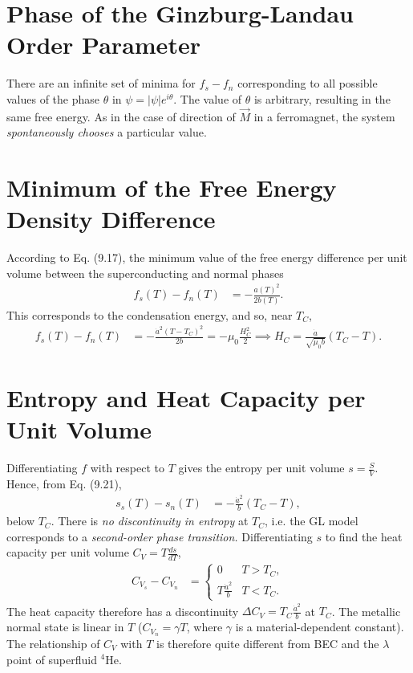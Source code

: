 \documentclass[qo.tex]{subfiles}
\begin{document}
\section{Phase of the Ginzburg-Landau Order Parameter}
There are an infinite set of minima for $f_s-f_n$ corresponding to all possible values of the phase $\theta$ in $\psi=|\psi|e^{i\theta}$.
The value of $\theta$ is arbitrary, resulting in the same free energy. 
As in the case of direction of $\vec{M}$ in a ferromagnet, the system \emph{spontaneously chooses} a particular value. 

\section{Minimum of the Free Energy Density Difference}
According to Eq. (9.17), the minimum value of the free energy difference per unit volume between the superconducting and normal phases 
\begin{align}
    f_s(T) - f_n(T) &= -\frac{a(T)^2}{2b(T)}.
\end{align}
This corresponds to the condensation energy, and so, near $T_C$,
\begin{align}
    f_s(T) - f_n(T) &= -\frac{\dot{a}^2(T-T_C)^2}{2b} = -\mu_0\frac{H_C^2}{2}\implies H_C = \frac{\dot{a}}{\sqrt{\mu_0 b}}(T_C-T).
\end{align}

\section{Entropy and Heat Capacity per Unit Volume}
Differentiating $f$ with respect to $T$ gives the entropy per unit volume $s=\frac{S}{V}$.
Hence, from Eq. (9.21),
\begin{align}
    s_s(T) - s_n(T) &= -\frac{\dot{a}^2}{b}(T_C-T),
\end{align}
below $T_C$.
There is \emph{no discontinuity in entropy} at $T_C$, i.e. the GL model corresponds to a \emph{second-order phase transition.}
Differentiating $s$ to find the heat capacity per unit volume $C_V=T\frac{ds}{dT}$,
\begin{align}
    C_{V_s} - C_{V_n} &= \begin{cases} 0 & T>T_C, \\ T\frac{\dot{a}^2}{b} & T<T_C.\end{cases}
\end{align}
The heat capacity therefore has a discontinuity $\Delta C_V = T_C\frac{\dot{a}^2}{b}$ at $T_C$.
The metallic normal state is linear in $T$ ($C_{V_n}=\gamma T$, where $\gamma$ is a material-dependent constant).
The relationship of $C_V$ with $T$ is therefore quite different from BEC and the $\lambda$ point of superfluid ${}^4$He.
\end{document}
